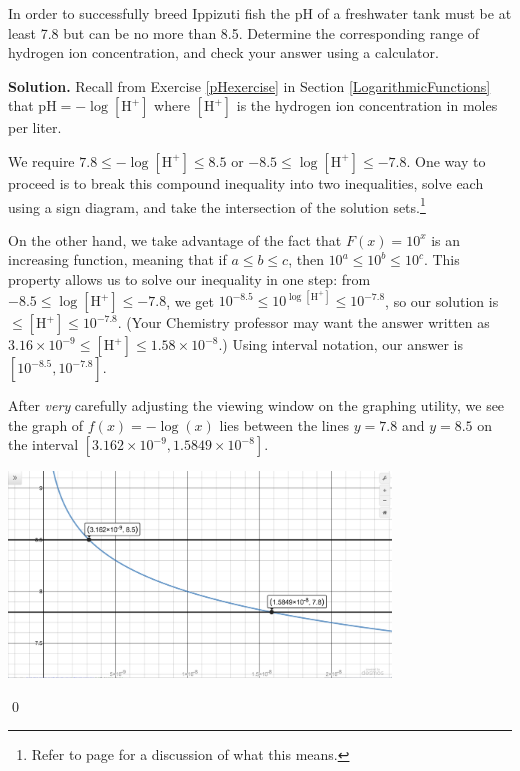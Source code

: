 \begin{ex}

In order to successfully breed Ippizuti fish the pH of a freshwater tank must be at least 7.8 but can be no more than 8.5.  Determine the corresponding range of hydrogen ion concentration, and check your answer using a calculator.

\smallskip

{\bf Solution.}  Recall from Exercise \ref{pHexercise} in Section \ref{LogarithmicFunctions} that $\text{pH} = -\log[\text{H}^{+}]$ where $[\text{H}^{+}]$ is the hydrogen ion concentration in moles per liter.  

\smallskip

We require $7.8 \leq -\log[\text{H}^{+}] \leq 8.5$ or $-8.5 \leq   \log[\text{H}^{+}] \leq -7.8$.  One way to proceed is to break this compound inequality into two inequalities, solve each using a sign diagram, and take the intersection of the solution sets.\footnote{Refer to page \pageref{intersectionunion} for a discussion of what this means.}  

\smallskip

On the other hand, we take advantage of the fact that $F(x) = 10^{x}$ is an increasing function, meaning that if $a \leq b \leq c$, then $10^{a} \leq 10^{b} \leq 10^{c}$.  This property allows us to solve our inequality in one step: from $-8.5 \leq   \log[\text{H}^{+}] \leq -7.8$, we get   $10^{-8.5} \leq   10^{\log[\text{H}^{+}]} \leq 10^{-7.8}$, so our solution is $ \leq   [\text{H}^{+}] \leq 10^{-7.8}$.  (Your Chemistry professor may want the answer written as $3.16 \times 10^{-9} \leq [\text{H}^{+}] \leq 1.58 \times 10^{-8}$.)  Using interval notation, our answer is $\left[10^{-8.5}, 10^{-7.8}\right]$.   

\smallskip

After \textit{very} carefully adjusting the viewing window on the graphing utility, we see the graph of $f(x) = -\log(x)$ lies between the lines $y = 7.8$ and $y = 8.5$ on the interval $[3.162 \times 10^{-9}, 1.5849 \times 10^{-8}]$.

\smallskip

\begin{center}

\includegraphics[width=4in]{./LogarithmicEquationsandInequalitiesGraphics/LogEqnEx10.jpg}

\end{center}

\qed

\end{ex}

